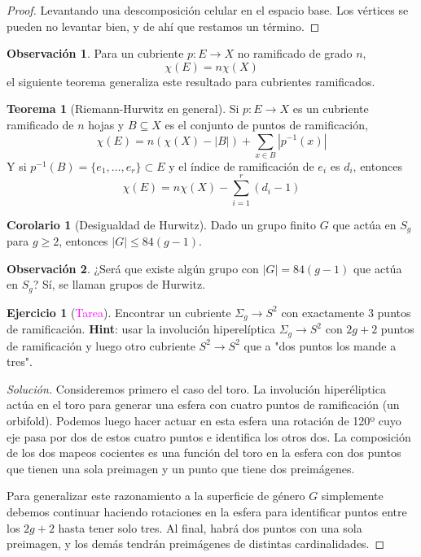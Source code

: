 \documentclass[spanish]{article}
\theoremstyle{definition}
\newtheorem*{obs}{Observación}
\newtheorem*{teo}{Teorema}
\newtheorem*{coro}{Corolario}
\newtheorem*{ejer}{Ejercicio}
\begin{document}
\begin{proof}
	Levantando una descomposición celular en el espacio base. Los vértices se pueden no levantar bien, y de ahí que restamos un término.
\end{proof}
\begin{obs}
	Para un cubriente $p:E\to X$ no ramificado de grado $n$,
	\[\chi(E)=n\chi(X)\]
	el siguiente teorema generaliza este resultado para cubrientes ramificados.
\end{obs}
\begin{teo}[Riemann-Hurwitz en general]
	Si $p:E\to X$ es un cubriente ramificado de $n$ hojas y $B\subseteq X$ es el conjunto de puntos de ramificación,
	\[\chi(E)=n(\chi(X)-|B|)+\sum_{x\in B}|p^{-1}(x)|\]
	Y si $p^{-1}(B)=\{e_1,\ldots,e_r\}\subset E$ y el índice de ramificación de $e_i$ es $d_i$, entonces
	\[\chi(E)=n\chi(X)-\sum_{i=1}^r(d_i-1)\]
\end{teo}
\begin{coro}[Desigualdad de Hurwitz]
	Dado un grupo finito $G$ que actúa en $S_g$ para $g\geq2$, entonces $|G|\leq84(g-1)$.
\end{coro}
\begin{obs}
	¿Será que existe algún grupo con $|G|=84(g-1)$ que actúa en $S_g$? Sí, se llaman grupos de Hurwitz.
\end{obs}
\begin{ejer}[\textcolor{magenta}{Tarea}]
	Encontrar un cubriente $\Sigma_g\to S^2$ con exactamente 3 puntos de ramificación. \textbf{Hint}: usar la involución hiperelíptica $\Sigma_g\to S^2$ con $2g+2$ puntos de ramificación y luego otro cubriente $S^2\to S^2$ que a "dos puntos los mande a tres".
\end{ejer}
\begin{proof}[Solución]
	Consideremos primero el caso del toro. La involución hiperéliptica actúa en el toro para generar una esfera con cuatro puntos de ramificación (un orbifold). Podemos luego hacer actuar en esta esfera una rotación de 120º cuyo eje pasa por dos de estos cuatro puntos e identifica los otros dos. La composición de los dos mapeos cocientes es una función del toro en la esfera con dos puntos que tienen una sola preimagen y un punto que tiene dos preimágenes.
	
	Para generalizar este razonamiento a la superficie de género $G$ simplemente debemos continuar haciendo rotaciones en la esfera para identificar puntos entre los $2g+2$ hasta tener solo tres. Al final, habrá dos puntos con una sola preimagen, y los demás tendrán preimágenes de distintas cardinalidades.
\end{proof}
\end{document}
